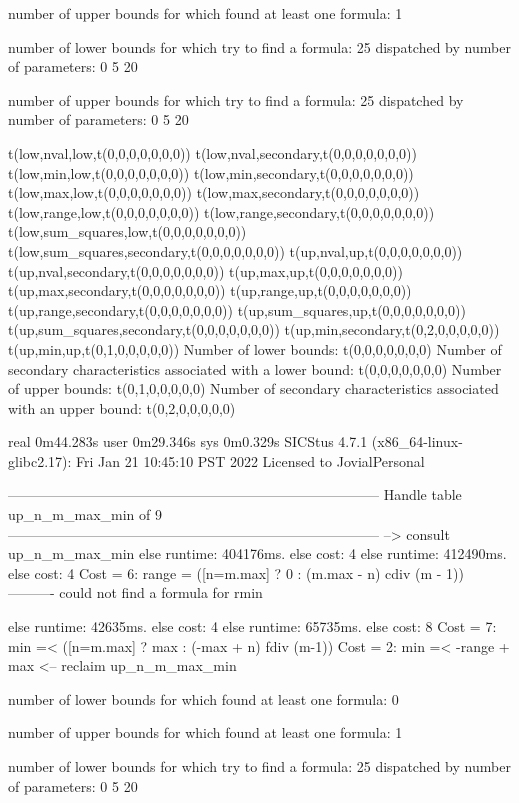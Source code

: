 number of upper bounds for which found at least one formula: 1

number of lower bounds for which try to find a formula: 25
dispatched by number of parameters: 0  5  20

number of upper bounds for which try to find a formula: 25
dispatched by number of parameters: 0  5  20

t(low,nval,low,t(0,0,0,0,0,0,0))
t(low,nval,secondary,t(0,0,0,0,0,0,0))
t(low,min,low,t(0,0,0,0,0,0,0))
t(low,min,secondary,t(0,0,0,0,0,0,0))
t(low,max,low,t(0,0,0,0,0,0,0))
t(low,max,secondary,t(0,0,0,0,0,0,0))
t(low,range,low,t(0,0,0,0,0,0,0))
t(low,range,secondary,t(0,0,0,0,0,0,0))
t(low,sum_squares,low,t(0,0,0,0,0,0,0))
t(low,sum_squares,secondary,t(0,0,0,0,0,0,0))
t(up,nval,up,t(0,0,0,0,0,0,0))
t(up,nval,secondary,t(0,0,0,0,0,0,0))
t(up,max,up,t(0,0,0,0,0,0,0))
t(up,max,secondary,t(0,0,0,0,0,0,0))
t(up,range,up,t(0,0,0,0,0,0,0))
t(up,range,secondary,t(0,0,0,0,0,0,0))
t(up,sum_squares,up,t(0,0,0,0,0,0,0))
t(up,sum_squares,secondary,t(0,0,0,0,0,0,0))
t(up,min,secondary,t(0,2,0,0,0,0,0))
t(up,min,up,t(0,1,0,0,0,0,0))
Number of lower bounds:                                             t(0,0,0,0,0,0,0)
Number of secondary characteristics associated with a lower bound:  t(0,0,0,0,0,0,0)
Number of upper bounds:                                             t(0,1,0,0,0,0,0)
Number of secondary characteristics associated with an upper bound: t(0,2,0,0,0,0,0)

real	0m44.283s
user	0m29.346s
sys	0m0.329s
SICStus 4.7.1 (x86_64-linux-glibc2.17): Fri Jan 21 10:45:10 PST 2022
Licensed to JovialPersonal


--------------------------------------------------------------------------------
Handle table up_n_m_max_min of 9
--------------------------------------------------------------------------------
--> consult up_n_m_max_min
else runtime: 404176ms. else cost: 4
else runtime: 412490ms. else cost: 4
Cost =  6:  range = ([n=m.max] ? 0 : (m.max - n) cdiv (m - 1)) %
----------
could not find a formula for rmin

else runtime: 42635ms. else cost: 4
else runtime: 65735ms. else cost: 8
Cost =  7:  min =< ([n=m.max] ? max : (-max + n) fdiv (m-1)) %
Cost =  2:  min =< -range + max
<-- reclaim up_n_m_max_min

number of lower bounds for which found at least one formula: 0

number of upper bounds for which found at least one formula: 1

number of lower bounds for which try to find a formula: 25
dispatched by number of parameters: 0  5  20

